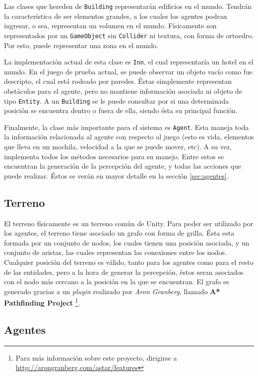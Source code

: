 \documentclass[a4paper,oneside]{article}
\begin{document}
Las clases que hereden de \texttt{Building} representarán edificios en el mundo. Tendrán
la característica de ser elementos grandes, a los cuales los agentes podran ingresar, o 
sea, representan un volumen en el mundo. Físicamente son representados por un 
\texttt{GameObject} sin \texttt{Collider} ni textura, con forma de ortoedro. Por esto, puede representar una zona en el mundo.

La implementación actual de esta clase es \texttt{Inn}, el cual representaría un hotel
en el mundo. En el juego de prueba actual, se puede observar un objeto vacío como fue
descripto, el cual está rodeado por paredes. Éstas simplemente representan obstáculos 
para el agente, pero no mantiene información asociada ni objeto de tipo \texttt{Entity}.
A un \texttt{Building} se le puede consultar por si una determinada posición se 
encuentra dentro o fuera de ella, siendo ésta su principal función.

Finalmente, la clase más importante para el sistema es \texttt{Agent}. Esta maneja toda
la información relacionada al agente con respecto al juego (esto es vida, elementos que
lleva en un mochila, velocidad a la que se puede mover, etc). A su vez, implementa todos
los métodos necesarios para su manejo. Entre estos se encuentran la generación de la 
percepción del agente, y todas las acciones que puede realizar. Éstos se verán en mayor
detalle en la sección \ref{sec:agentes}.

\subsection{Terreno}

El terreno físicamente es un terreno común de Unity. Para poder ser utilizado por los
agentes, el terreno tiene asociado un grafo con forma de grilla. Ésta esta formada 
por un conjunto de nodos, los cuales tienen una posición asociada, y un conjunto de 
aristas, las cuales representan las conexiones entre los nodos. Cualquier posición del 
terreno es válido, tanto para los agentes como para el resto de las entidades, pero a la 
hora de generar la percepción, éstos seran asociados con el nodo más cercano a la 
posición en la que se encuentran. El grafo es generado gracias a un \textit{plugin} 
realizado por \textit{Aron Granberg}, llamado \textbf{A* Pathfinding Project} 
\footnote{Para más información sobre este proyecto, dirigirse a 
\url{http://arongranberg.com/astar/features}}.

\subsection{Agentes}
\end{document}
